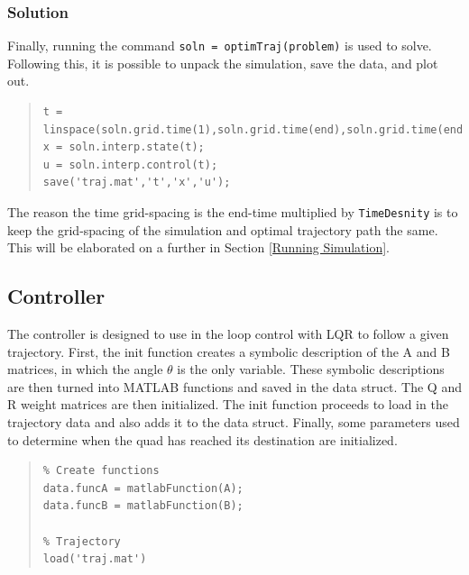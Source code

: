 \documentclass[12pt]{article}
\begin{document}
\subsubsection{Solution}
Finally, running the command \lstinline!soln = optimTraj(problem)! is used to solve. Following this, it is possible to unpack the simulation, save the data, and plot out.
\begin{quote}
\begin{lstlisting}
t = linspace(soln.grid.time(1),soln.grid.time(end),soln.grid.time(end)*TimeDensity);
x = soln.interp.state(t);
u = soln.interp.control(t);
save('traj.mat','t','x','u');
\end{lstlisting}
\end{quote}

The reason the time grid-spacing is the end-time multiplied by \lstinline!TimeDesnity! is to keep the grid-spacing of the simulation and optimal trajectory path the same. This will be elaborated on a further in Section \ref{Running Simulation}.

\subsection{Controller}
The controller is designed to use in the loop control with LQR to follow a given trajectory. First, the init function creates a symbolic description of the A and B matrices, in which the angle $\theta$ is the only variable.  These symbolic descriptions are then turned into MATLAB functions and saved in the data struct.  The Q and R weight matrices are then initialized.  The init function proceeds to load in the trajectory data and also adds it to the data struct.  Finally, some parameters used to determine when the quad has reached its destination are initialized.
\begin{quote}
\begin{lstlisting}
% Create functions
data.funcA = matlabFunction(A);
data.funcB = matlabFunction(B);

% Trajectory
load('traj.mat')
\end{lstlisting}
\end{quote}
\end{document}
